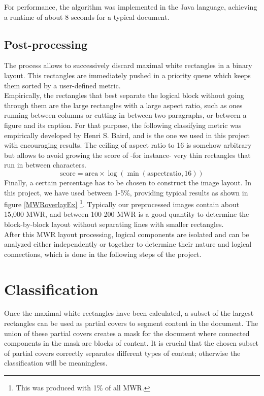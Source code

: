 \documentclass{report}
\begin{document}
For performance, the algorithm was implemented in the Java language, achieving a runtime of about 8 seconds for a typical document.

\section{Post-processing}
The process allows to successively discard maximal white rectangles in a binary layout. This rectangles are immediately pushed in a priority
queue which keeps them sorted by a user-defined metric.\\
Empirically, the rectangles that best separate the logical block without going through them are the large rectangles with a large aspect ratio,
such as ones running between columns or cutting in between two paragraphs, or between a figure and its caption. For that purpose, the following
classifying metric was empirically developed by Henri S. Baird, and is the one we used in this project with encouraging results. The ceiling of
aspect ratio to 16 is somehow arbitrary but allows to avoid growing the score of -for instance- very thin rectangles that run in between
characters.
\[
\mathrm{score} = \mathrm{area} \times \log(\min(\mathrm{aspect ratio}, 16))
\]
Finally, a certain percentage has to be chosen to construct the image layout. In this project, we have used between 1-5\%, providing typical
results as shown in figure \ref{MWRoverlayEx} \footnote{This was produced with 1\% of all MWR.}. Typically our preprocessed images contain about 15,000 MWR, and between 100-200 MWR is a good
quantity to determine the block-by-block layout without separating lines with smaller rectangles.\\

After this MWR layout processing, logical components are isolated and can be analyzed either independently or together to determine their nature
and logical connections, which is done in the following steps of the project.

\chapter{Classification}
Once the maximal white rectangles have been calculated, a subset of the largest rectangles can be used as partial covers to segment content in the document. The union of these partial covers creates a mask for the document where connected components in the mask are blocks of content. It is crucial that the chosen subset of partial covers correctly separates different types of content; otherwise the classification will be meaningless.
\end{document}

